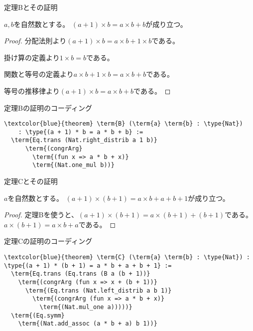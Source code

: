 \documentclass[unicode,12pt]{beamer}%
\newcommand{\type}[1]{\colorbox{green}{#1}}
\newcommand{\term}[1]{\colorbox{yellow}{#1}}
\begin{document}
\begin{frame}{定理Bとその証明}
  \begin{theorem}
    $a, b$を自然数とする。
    $(a+1)\times b=a\times b+b$が成り立つ。      
  \end{theorem}

  \begin{proof}
    分配法則より$(a+1)\times b=a\times b+1\times b$である。

    掛け算の定義より$1\times b= b$である。
    
    関数と等号の定義より$a\times b+1\times b=a\times b+ b$である。
    
    等号の推移律より$(a+1)\times b=a\times b+b$である。    
  \end{proof}
\end{frame}

\begin{frame}[fragile]{定理Bの証明のコーディング}
  \begin{tcolorbox}[title=SecondTheorems.lean]
  \setlength{\baselineskip}{12pt}
  \begin{Verbatim}[commandchars=\\\{\}, baselinestretch=1.5]
\textcolor{blue}{theorem} \term{B} (\term{a} \term{b} : \type{Nat})
    : \type{(a + 1) * b = a * b + b} :=
  \term{Eq.trans (Nat.right_distrib a 1 b)}
      \term{(congrArg}
        \term{(fun x => a * b + x)}
        \term{(Nat.one_mul b))}
  \end{Verbatim}
  \end{tcolorbox}  
\end{frame}

\begin{frame}{定理Cとその証明}
  \begin{theorem}
    $a$を自然数とする。
    $(a+1)\times(b+1)=a\times b+a+b+1$が成り立つ。      
  \end{theorem}

  \begin{proof}
    定理Bを使うと、$(a+1)\times(b+1)=a\times(b+1)+(b+1)$である。
    $a\times(b+1)=a\times b+a$である。      
  \end{proof}
\end{frame}

\begin{frame}[fragile]{定理Cの証明のコーディング}
  \begin{tcolorbox}[title=SecondTheorems.lean]
  \setlength{\baselineskip}{12pt}
  \begin{Verbatim}[commandchars=\\\{\}, baselinestretch=1.5]
\textcolor{blue}{theorem} \term{C} (\term{a} \term{b} : \type{Nat}) :
\type{(a + 1) * (b + 1) = a * b + a + b + 1} :=
  \term{Eq.trans (Eq.trans (B a (b + 1))}
    \term{(congrArg (fun x => x + (b + 1))}
      \term{(Eq.trans (Nat.left_distrib a b 1)}
        \term{(congrArg (fun x => a * b + x)}
          \term{(Nat.mul_one a)))))}
  \term{(Eq.symm}
    \term{(Nat.add_assoc (a * b + a) b 1))}
  \end{Verbatim}
  \end{tcolorbox}  
\end{frame}
\end{document}
